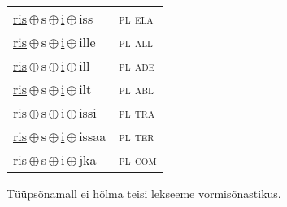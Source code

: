 \begin{minipage}{\textwidth}
\begin{sideways}
\begin{tabular}{l l}
\underline{ris}\,$\oplus$\,s\,$\oplus$\,\underline{i}\,$\oplus$\,iss & \textsc{ pl ela } \\
\underline{ris}\,$\oplus$\,s\,$\oplus$\,\underline{i}\,$\oplus$\,ille & \textsc{ pl all } \\
\underline{ris}\,$\oplus$\,s\,$\oplus$\,\underline{i}\,$\oplus$\,ill & \textsc{ pl ade } \\
\underline{ris}\,$\oplus$\,s\,$\oplus$\,\underline{i}\,$\oplus$\,ilt & \textsc{ pl abl } \\
\underline{ris}\,$\oplus$\,s\,$\oplus$\,\underline{i}\,$\oplus$\,issi & \textsc{ pl tra } \\
\underline{ris}\,$\oplus$\,s\,$\oplus$\,\underline{i}\,$\oplus$\,issaa & \textsc{ pl ter } \\
\underline{ris}\,$\oplus$\,s\,$\oplus$\,\underline{i}\,$\oplus$\,jka & \textsc{ pl com } \\
\end{tabular}
\end{sideways}
\label{tab:tüüpsõnamall-rissi}

\end{minipage}

 
\vspace{1em}
\noindent Tüüpsõnamall  ei hõlma teisi lekseeme vormi\-sõnastikus.
